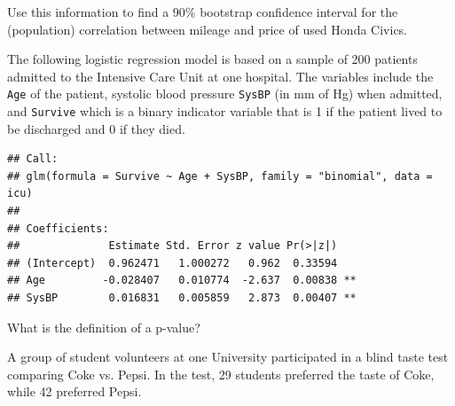 \documentclass[11pt]{exam}
\begin{document}
\begin{questions}
Use this information to find a 90\% bootstrap confidence interval for the (population) correlation between mileage and price of used Honda Civics.  
\vfill

\newpage
\question The following logistic regression model is based on a sample of 200 patients admitted to the Intensive Care Unit at one hospital.  The variables include the \verb|Age| of the patient, systolic blood pressure \verb|SysBP| (in mm of Hg) when admitted, and \verb|Survive| which is a binary indicator variable that is 1 if the patient lived to be discharged and 0 if they died. 

\begin{verbatim}
## Call:
## glm(formula = Survive ~ Age + SysBP, family = "binomial", data = icu)
## 
## Coefficients:
##              Estimate Std. Error z value Pr(>|z|)   
## (Intercept)  0.962471   1.000272   0.962  0.33594   
## Age         -0.028407   0.010774  -2.637  0.00838 **
## SysBP        0.016831   0.005859   2.873  0.00407 **
\end{verbatim}


\question What is the definition of a p-value? 
\vspace*{1in}

\question A group of student volunteers at one University participated in a blind taste test comparing Coke vs. Pepsi. In the test, 29 students preferred the taste of Coke, while 42 preferred Pepsi. 
\begin{parts}

\end{parts}
\end{questions}
\end{document}
